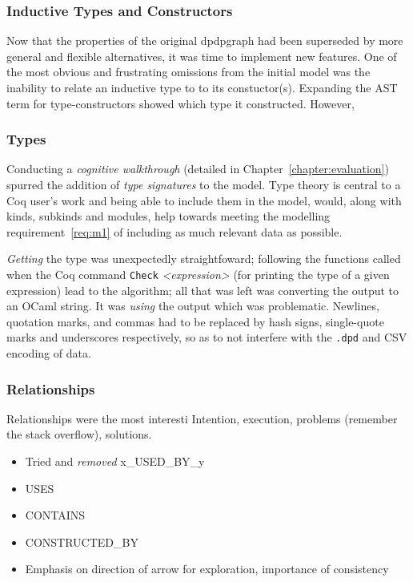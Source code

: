 \subsubsection{Inductive Types and Constructors}

Now that the properties of the original dpdpgraph had been superseded by more
general and flexible alternatives, it was time to implement new features.  One
of the most obvious and frustrating omissions from the initial model was the
inability to relate an inductive type to to its constuctor(s). Expanding the 
AST term for type-constructors showed which type it constructed. However,

\subsubsection{Types}

Conducting a \emph{cognitive walkthrough} (detailed in
Chapter~\ref{chapter:evaluation}) spurred the addition of \emph{type
signatures} to the model. Type theory is central to a Coq user's work and being
able to include them in the model, would, along with kinds, subkinds and
modules, help towards meeting the modelling requirement~\ref{req:m1} of
including as much relevant data as possible. 

\emph{Getting} the type was unexpectedly straightfoward; following the
functions called when the Coq command \texttt{Check} \emph{<expression>} (for
printing the type of a given expression) lead to the algorithm; all that was
left was converting the output to an OCaml string. It was \emph{using} the
output which was problematic. Newlines, quotation marks, and commas had to be
replaced by hash signs, single-quote marks and underscores respectively, so as
to not interfere with the \texttt{.dpd} and CSV encoding of data.


\subsubsection{Relationships}

Relationships were the most interesti
Intention, execution, problems (remember the stack overflow), solutions.

\begin{itemize}
  \item Tried and \emph{removed} x\_USED\_BY\_y
  \item USES
  \item CONTAINS
  \item CONSTRUCTED\_BY
  \item Emphasis on direction of arrow for exploration, importance of consistency
\end{itemize}

